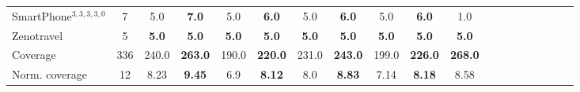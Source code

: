 \documentclass[letterpaper]{article} %
\begin{document}
\begin{table*}[h]
\begin{tabular}{lccccccccccccccccccl}
	SmartPhone$^{3,3,3,3,0}$ & 7 & 5.0 & \textbf{7.0} & 5.0 & \textbf{6.0} & 5.0 & \textbf{6.0} & 5.0 & \textbf{6.0} &\multicolumn{2}{c}{ 1.0  } \\ 
	Zenotravel & 5 & \textbf{5.0} & \textbf{5.0} & \textbf{5.0} & \textbf{5.0} & \textbf{5.0} & \textbf{5.0} & \textbf{5.0} & \textbf{5.0} &\multicolumn{2}{c}{ \textbf{5.0}  } \\ 
	\midrule 
	Coverage & 336 & 240.0 & \textbf{263.0} & 190.0 & \textbf{220.0} & 231.0 & \textbf{243.0} & 199.0 & \textbf{226.0} &\multicolumn{2}{c}{ \textbf{268.0}  } \\ 
	Norm. coverage & 12 & 8.23 & \textbf{9.45} & 6.9 & \textbf{8.12} & 8.0 & \textbf{8.83} & 7.14 & \textbf{8.18} &\multicolumn{2}{c}{ 8.58  } \\ 
	\bottomrule 
\end{tabular} 
\end{table*}
\end{document}
